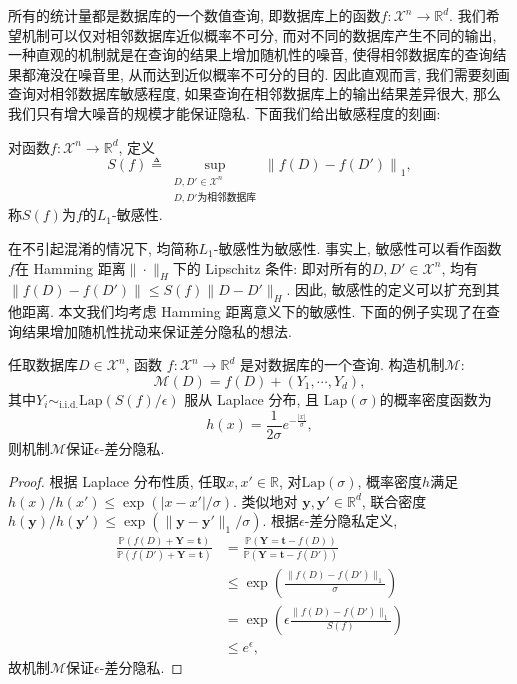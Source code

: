 所有的统计量都是数据库的一个数值查询, 即数据库上的函数$f : \mathcal{X}^n \to \mathbb R^d$. 我们希望机制可以仅对相邻数据库近似概率不可分, 而对不同的数据库产生不同的输出, 一种直观的机制就是在查询的结果上增加随机性的噪音, 使得相邻数据库的查询结果都淹没在噪音里, 从而达到近似概率不可分的目的. 因此直观而言, 我们需要刻画查询对相邻数据库敏感程度, 如果查询在相邻数据库上的输出结果差异很大, 那么我们只有增大噪音的规模才能保证隐私. 下面我们给出敏感程度的刻画:
\begin{defn}[$L_1$-敏感性]
  对函数$f : \mathcal{X}^n \to \mathbb R^d$, 定义
  \[
  S(f) \triangleq \sup_{\substack{D, D'\in \mathcal{X}^n \\ \text{$D, D'$为相邻数据库}}}\left\| f(D) - f(D') \right\|_1,
  \]
  称$S(f)$为$f$的$L_1$-敏感性.
\end{defn}
在不引起混淆的情况下, 均简称$L_1$-敏感性为敏感性. 事实上, 敏感性可以看作函数 $f$在 Hamming 距离$\|\cdot\|_H$下的 Lipschitz 条件: 即对所有的$D, D'\in\mathcal {X}^n$, 均有$\|f(D) - f(D')\| \le S(f) \| D - D'\|_H$. 因此, 敏感性的定义可以扩充到其他距离. 本文我们均考虑 Hamming 距离意义下的敏感性. 下面的例子实现了在查询结果增加随机性扰动来保证差分隐私的想法.

\begin{example}\label{exa:单个查询的Laplace机制}
  任取数据库$D \in \mathcal{X}^n$, 函数 $f : \mathcal{X}^n \to \mathbb R^d$ 是对数据库的一个查询. 构造机制$\mathcal{M}$:
  \[
  \mathcal{M}(D) = f(D) + (Y_1, \cdots, Y_d),
  \]
  其中$Y_i \sim_{\text{i.i.d.}} \mathrm{Lap}(S(f)/\epsilon)$ 服从 Laplace 分布, 且 $\mathrm{Lap}(\sigma)$的概率密度函数为
  \[
  h(x) = \frac{1}{2\sigma} e^{ - \frac{|x|}{\sigma}},
  \]
  则机制$\mathcal{M}$保证$\epsilon$-差分隐私.
\end{example}
\begin{proof}
  根据 Laplace 分布性质, 任取$x, x' \in \mathbb R$, 对$\mathrm{Lap}(\sigma)$, 概率密度$h$满足 $h(x)/h(x') \le \exp ( | x - x'| / \sigma)$. 类似地对 $\mathbf{y}, \mathbf{y}' \in\mathbb R^d$, 联合密度 $h(\mathbf{y})/h(\mathbf{y}') \le \exp( \|\mathbf{y} - \mathbf{y}'\|_1 / \sigma)$. 根据$\epsilon$-差分隐私定义, 
  \[
  \begin{split}
    \frac{\mathbb{P}(f(D) + \mathbf{Y} = \mathbf{t})}{\mathbb{P}(f(D') + \mathbf{Y} = \mathbf{t})} &=  \frac{\mathbb{P}(\mathbf{Y} = \mathbf{t} - f(D))}{\mathbb{P}(\mathbf{Y} = \mathbf{t} - f(D'))} \\
    & \le \exp \left( \frac{\| f(D) - f(D') \|_1}{\sigma} \right) \\
    & = \exp \left( \epsilon \frac{\| f(D) - f(D') \|_1}{S(f)} \right) \\
    & \le e^\epsilon,
  \end{split}
  \]
  故机制$\mathcal{M}$保证$\epsilon$-差分隐私.
\end{proof}

